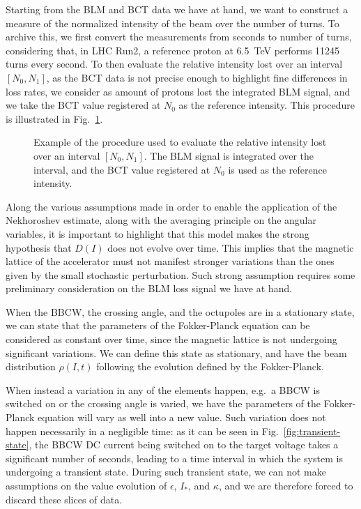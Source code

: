 Starting from the BLM and BCT data we have at hand, we want to construct a measure of the normalized intensity of the beam over the number of turns. To archive this, we first convert the measurements from seconds to number of turns, considering that, in LHC Run2, a reference proton at \SI{6.5}{TeV} performs 11245 turns every second. To then evaluate the relative intensity lost over an interval $[N_0, N_1]$, as the BCT data is not precise enough to highlight fine differences in loss rates, we consider as amount of protons lost the integrated BLM signal, and we take the BCT value registered at $N_0$ as the reference intensity. This procedure is illustrated in Fig.~\ref{fig:blm-to-intensity}.

\begin{figure}[hpt]
    \centering
    \caption{Example of the procedure used to evaluate the relative intensity lost over an interval $[N_0, N_1]$. The BLM signal is integrated over the interval, and the BCT value registered at $N_0$ is used as the reference intensity.}
    \label{fig:blm-to-intensity}
\end{figure}

Along the various assumptions made in order to enable the application of the Nekhoroshev estimate, along with the averaging principle on the angular variables, it is important to highlight that this model makes the strong hypothesis that $D(I)$ does not evolve over time. This implies that the magnetic lattice of the accelerator must not manifest stronger variations than the ones given by the small stochastic perturbation. Such strong assumption requires some preliminary consideration on the BLM loss signal we have at hand.

When the BBCW, the crossing angle, and the octupoles are in a stationary state, we can state that the parameters of the Fokker-Planck equation can be considered as constant over time, since the magnetic lattice is not undergoing significant variations. We can define this state as stationary, and have the beam distribution $\rho(I, t)$ following the evolution defined by the Fokker-Planck.

When instead a variation in any of the elements happen, e.g.\ a BBCW is switched on or the crossing angle is varied, we have the parameters of the Fokker-Planck equation will vary as well into a new value. Such variation does not happen necessarily in a negligible time: as it can be seen in Fig.~\ref{fig:transient-state}, the BBCW DC current being switched on to the target voltage takes a significant number of seconds, leading to a time interval in which the system is undergoing a transient state. During such transient state, we can not make assumptions on the value evolution of $\epsilon$, $I_\ast$, and $\kappa$, and we are therefore forced to discard these slices of data.

